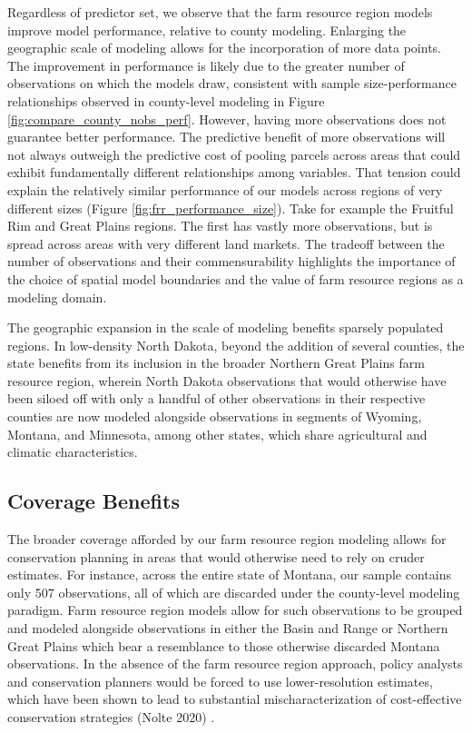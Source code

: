 \documentclass[12pt]{article}
\begin{document}
Regardless of predictor set, we observe that the farm resource region models improve model performance, relative to county modeling. Enlarging the geographic scale of modeling allows for the incorporation of more data points. The improvement in performance is likely due to the greater number of observations on which the models draw, consistent with sample size-performance relationships observed in county-level modeling in Figure \ref{fig:compare_county_nobs_perf}. However, having more observations does not guarantee better performance. The predictive benefit of more observations will not always outweigh the predictive cost of pooling parcels across areas that could exhibit fundamentally different relationships among variables. That tension could explain the relatively similar performance of our models across regions of very different sizes (Figure \ref{fig:frr_performance_size}). Take for example the Fruitful Rim and Great Plains regions. The first has vastly more observations, but is spread across areas with very different land markets. The tradeoff between the number of observations and their commensurability highlights the importance of the choice of spatial model boundaries and the value of farm resource regions as a modeling domain. 

The geographic expansion in the scale of modeling benefits sparsely populated regions. In low-density North Dakota, beyond the addition of several counties, the state benefits from its inclusion in the broader Northern Great Plains farm resource region, wherein North Dakota observations that would otherwise have been siloed off with only a handful of other observations in their respective counties are now modeled alongside observations in segments of Wyoming, Montana, and Minnesota, among other states, which share agricultural and climatic characteristics. 

\subsection{Coverage Benefits}

The broader coverage afforded by our farm resource region modeling allows for conservation planning in areas that would otherwise need to rely on cruder estimates. For instance, across the entire state of Montana, our sample contains only 507 observations, all of which are discarded under the county-level modeling paradigm. Farm resource region models allow for such observations to be grouped and modeled alongside observations in either the Basin and Range or Northern Great Plains which bear a resemblance to those otherwise discarded Montana observations. In the absence of the farm resource region approach, policy analysts and conservation planners would be forced to use lower-resolution estimates, which have been shown to lead to substantial mischaracterization of cost-effective conservation strategies (Nolte 2020) .
\end{document}
